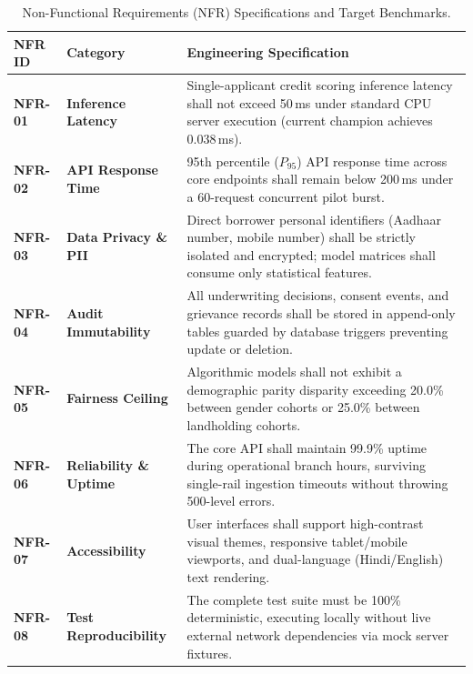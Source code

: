 \begin{table}[H]
\centering
\small
\renewcommand{\arraystretch}{1.2}
\begin{tabularx}{\textwidth}{l p{3.2cm} X}
  \toprule
  \textbf{NFR ID} & \textbf{Category} & \textbf{Engineering Specification} \\
  \midrule
  \textbf{NFR-01} & \textbf{Inference Latency} & Single-applicant credit scoring inference latency shall not exceed 50\,ms under standard CPU server execution (current champion achieves 0.038\,ms). \\
  \addlinespace
  \textbf{NFR-02} & \textbf{API Response Time} & 95th percentile ($P_{95}$) API response time across core endpoints shall remain below 200\,ms under a 60-request concurrent pilot burst. \\
  \addlinespace
  \textbf{NFR-03} & \textbf{Data Privacy \& PII} & Direct borrower personal identifiers (Aadhaar number, mobile number) shall be strictly isolated and encrypted; model matrices shall consume only statistical features. \\
  \addlinespace
  \textbf{NFR-04} & \textbf{Audit Immutability} & All underwriting decisions, consent events, and grievance records shall be stored in append-only tables guarded by database triggers preventing update or deletion. \\
  \addlinespace
  \textbf{NFR-05} & \textbf{Fairness Ceiling} & Algorithmic models shall not exhibit a demographic parity disparity exceeding 20.0\% between gender cohorts or 25.0\% between landholding cohorts. \\
  \addlinespace
  \textbf{NFR-06} & \textbf{Reliability \& Uptime} & The core API shall maintain 99.9\% uptime during operational branch hours, surviving single-rail ingestion timeouts without throwing 500-level errors. \\
  \addlinespace
  \textbf{NFR-07} & \textbf{Accessibility} & User interfaces shall support high-contrast visual themes, responsive tablet/mobile viewports, and dual-language (Hindi/English) text rendering. \\
  \addlinespace
  \textbf{NFR-08} & \textbf{Test Reproducibility} & The complete test suite must be 100\% deterministic, executing locally without live external network dependencies via mock server fixtures. \\
  \bottomrule
\end{tabularx}
\caption{Non-Functional Requirements (NFR) Specifications and Target Benchmarks.}
\label{tab:nfr_table}
\end{table}
